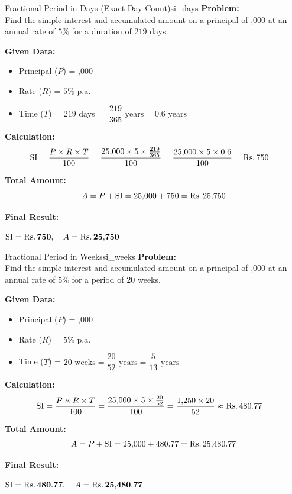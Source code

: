 \begin{example}{Fractional Period in Days (Exact Day Count)}{si_days}
\textbf{Problem:} \\
Find the simple interest and accumulated amount on a principal of ,000 at an annual rate of $5\%$ for a duration of $219$ days.

\tcbline
\textbf{Given Data:}
\begin{itemize}[noitemsep]
    \item Principal ($P$) = ,000
    \item Rate ($R$) = $5\%$ p.a.
    \item Time ($T$) = $219$ days $= \dfrac{219}{365}\text{ years} = 0.6\text{ years}$
\end{itemize}

\textbf{Calculation:}
\begin{align*}
    \operatorname{SI} &= \frac{P \times R \times T}{100} = \frac{25{,}000 \times 5 \times \frac{219}{365}}{100} = \frac{25{,}000 \times 5 \times 0.6}{100} = \text{Rs.}\, 750
\end{align*}

\textbf{Total Amount:}
\begin{equation*}
    A = P + \operatorname{SI} = 25{,}000 + 750 = \text{Rs.}\, 25{,}750
\end{equation*}

\textbf{Final Result:}
\begin{center}
    $\operatorname{SI} = \mathbf{\text{Rs.}\, 750}, \quad A = \mathbf{\text{Rs.}\, 25{,}750}$
\end{center}
\end{example}

\begin{example}{Fractional Period in Weeks}{si_weeks}
\textbf{Problem:} \\
Find the simple interest and accumulated amount on a principal of ,000 at an annual rate of $5\%$ for a period of $20$ weeks.

\tcbline
\textbf{Given Data:}
\begin{itemize}[noitemsep]
    \item Principal ($P$) = ,000
    \item Rate ($R$) = $5\%$ p.a.
    \item Time ($T$) = $20\text{ weeks} = \dfrac{20}{52}\text{ years} = \dfrac{5}{13}\text{ years}$
\end{itemize}

\textbf{Calculation:}
\begin{align*}
    \operatorname{SI} &= \frac{P \times R \times T}{100} = \frac{25{,}000 \times 5 \times \frac{20}{52}}{100} = \frac{1{,}250 \times 20}{52} \approx \text{Rs.}\, 480.77
\end{align*}

\textbf{Total Amount:}
\begin{equation*}
    A = P + \operatorname{SI} = 25{,}000 + 480.77 = \text{Rs.}\, 25{,}480.77
\end{equation*}

\textbf{Final Result:}
\begin{center}
    $\operatorname{SI} = \mathbf{\text{Rs.}\, 480.77}, \quad A = \mathbf{\text{Rs.}\, 25{,}480.77}$
\end{center}
\end{example}

